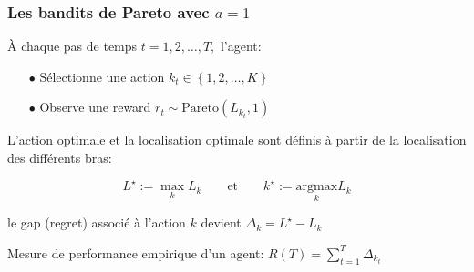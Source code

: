 \documentclass[8pt, sans]{beamer}
\begin{document}
\begin{frame}

\frametitle{Les bandits de Pareto avec $a=1$}

À chaque pas de temps $t=1,2,\ldots,T,$ l'agent:

\begin{itemize}

\item[$\bullet$] Sélectionne une action $k_t\in\left\{1,2,\ldots,K\right\}$

\item[$\bullet$] Observe une reward $r_t\sim \mathrm{Pareto}(L_{k_t},1)$

\end{itemize}

\vfill
\pause

L'action optimale et la localisation optimale sont définis à partir de la localisation des différents bras:

\pause
$$\displaystyle L^{\star} := \max_k L_k \qquad \text{et} \qquad k^{\star} := \underset{k}{\mathrm{argmax}} L_k$$ 

\pause
\vfill

le gap (regret) associé à l'action $k$ devient $\Delta_k= L^{\star}-L_k$ 

\pause
\vfill

Mesure de performance empirique d'un agent: $\displaystyle R(T)=\sum_{t=1}^T \Delta_{k_t}$

\end{frame}
\end{document}
